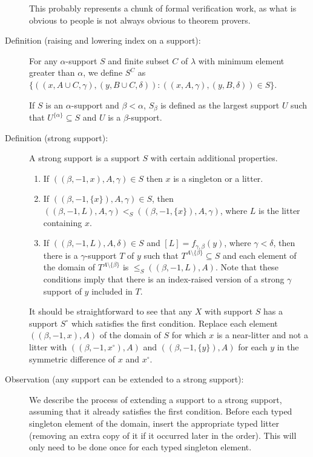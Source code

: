 \documentclass[112pt]{article}
\begin{document}
\begin{description}
This probably represents a chunk of formal verification work, as what is obvious to people is not always obvious to theorem provers.

\item[Definition (raising and lowering index on a support):]  For any $\alpha$-support $S$ and finite subset $C$ of $\lambda$ with minimum element greater than $\alpha$, we define $S^C$ as
$\{((x,A\cup C,\gamma),(y,B\cup C,\delta)):((x,A,\gamma),(y,B,\delta)) \in S\}$.

If $S$ is an $\alpha$-support and $\beta<\alpha$, $S_\beta$ is defined as the largest support $U$ such that $U^{\{\alpha\}} \subseteq S$ and $U$ is a $\beta$-support.

\item[Definition (strong support):]  A strong support is a support $S$ with certain additional properties.

\begin{enumerate}

\item  If $((\beta,-1,x),A,\gamma) \in S$ then $x$ is a singleton or a litter.

\item  If $((\beta,-1,\{x\}),A,\gamma) \in S$, then $((\beta,-1,L),A,\gamma) <_S ((\beta,-1,\{x\}),A,\gamma)$, where $L$ is the litter containing $x$.

\item  If $((\beta,-1,L),A,\delta) \in S$ and $[L]=f_{\gamma,\beta}(y)$, where $\gamma<\delta$, then there is a $\gamma$-support $T$ of $y$ such that $T^{A \setminus \{\beta\}} \subseteq S$ and each element of the domain of $T^{A \setminus \{\beta\}}$ is $\leq_S ((\beta,-1,L),A)$.  Note that these conditions imply that there is an index-raised version of a strong $\gamma$ support of $y$ included in $T$.

\end{enumerate}

It should be straightforward to see that any $X$ with support $S$ has a support $S^\circ$ which satisfies the first condition.  Replace each
element $((\beta,-1,x),A)$ of the domain of $S$ for which $x$ is a near-litter and not a litter with $((\beta,-1,x^\circ),A)$ and $((\beta,-1,\{y\}),A)$ for each $y$ in the symmetric difference of $x$ and $x^\circ$.

\item[Observation (any support can be extended to a strong support):]  We describe the process of extending a support to a strong support, assuming that it already satisfies the first condition.  Before each typed singleton element of the domain, insert the appropriate typed litter (removing an extra copy of it if it occurred later in the order).  This will only need to be done once for each typed singleton element.


\end{description}
\end{document}

